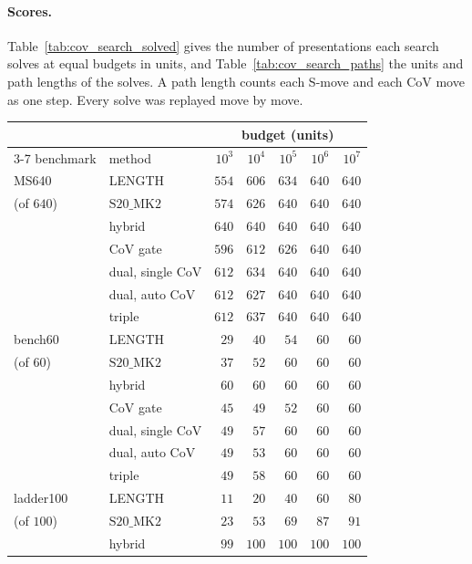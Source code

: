 \documentclass[11pt]{article}
\theoremstyle{definition}
\theoremstyle{remark}
\newcommand{\SMK}{\mathrm{S20\_MK2}}
\begin{document}
\paragraph{Scores.} Table~\ref{tab:cov_search_solved} gives the number of presentations each search solves at equal
budgets in units, and Table~\ref{tab:cov_search_paths} the units and path lengths of the solves. A path length counts
each S-move and each CoV move as one step. Every solve was replayed move by move.

\begin{table}[ht]
\centering
\small
\begin{tabular}{llrrrrr}
\toprule
& & \multicolumn{5}{c}{budget (units)}\\
\cmidrule(lr){3-7}
benchmark & method & $10^3$ & $10^4$ & $10^5$ & $10^6$ & $10^7$\\
\midrule
MS640 & LENGTH & $554$ & $606$ & $634$ & $640$ & $640$\\
(of $640$) & $\SMK$ & $574$ & $626$ & \underline{$640$} & $640$ & $640$\\
 & hybrid & \underline{$640$} & \underline{$640$} & \underline{$640$} & $640$ & $640$\\
 & CoV gate & $596$ & $612$ & $626$ & $640$ & $640$\\
 & dual, single CoV & $612$ & $634$ & \underline{$640$} & $640$ & $640$\\
 & dual, auto CoV & $612$ & $627$ & \underline{$640$} & $640$ & $640$\\
 & triple & $612$ & $637$ & \underline{$640$} & $640$ & $640$\\
\midrule
bench60 & LENGTH & $29$ & $40$ & $54$ & $60$ & $60$\\
(of $60$) & $\SMK$ & $37$ & $52$ & \underline{$60$} & $60$ & $60$\\
 & hybrid & \underline{$60$} & \underline{$60$} & \underline{$60$} & $60$ & $60$\\
 & CoV gate & $45$ & $49$ & $52$ & $60$ & $60$\\
 & dual, single CoV & $49$ & $57$ & \underline{$60$} & $60$ & $60$\\
 & dual, auto CoV & $49$ & $53$ & \underline{$60$} & $60$ & $60$\\
 & triple & $49$ & $58$ & \underline{$60$} & $60$ & $60$\\
\midrule
ladder100 & LENGTH & $11$ & $20$ & $40$ & $60$ & $80$\\
(of $100$) & $\SMK$ & $23$ & $53$ & $69$ & $87$ & $91$\\
 & hybrid & \underline{$99$} & \underline{$100$} & \underline{$100$} & \underline{$100$} & \underline{$100$}\\

\end{tabular}
\end{table}
\end{document}
